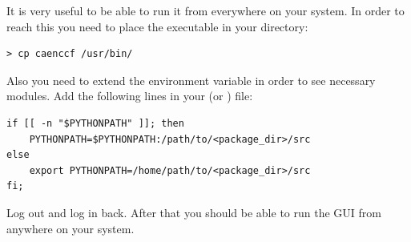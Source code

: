 It is very useful to be able to run it from everywhere on your system. In order to reach
this you need to place the executable in your  directory:
\begin{lstlisting}
> cp caenccf /usr/bin/
\end{lstlisting}
Also you need to extend the  environment variable in order 
to see necessary modules. Add the following lines in your  (or ) file:
\begin{lstlisting}
if [[ -n "$PYTHONPATH" ]]; then
    PYTHONPATH=$PYTHONPATH:/path/to/<package_dir>/src
else
    export PYTHONPATH=/home/path/to/<package_dir>/src
fi;
\end{lstlisting}
Log out and log in back. After that you should be able to run the GUI from anywhere on your system. 
